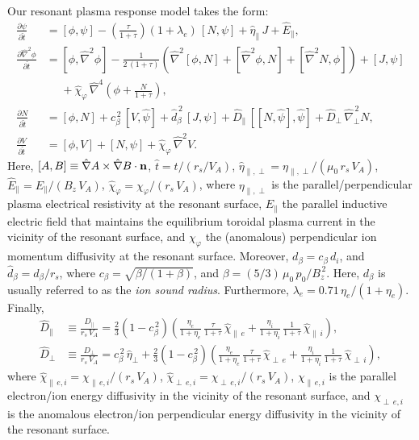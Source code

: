 \documentclass[12pt,prb,aps]{revtex4-1}
\begin{document}
Our resonant plasma response model takes the form:\,\cite{fw}
\begin{align}
\frac{\partial\psi}{\partial\hat{t}}&= [\phi,\psi] -\left(\frac{\tau}{1+\tau}\right)(1+\lambda_e)\,[N,\psi]
+\hat{\eta}_\parallel\,J + \hat{E}_\parallel,\\[0.5ex]
\frac{\partial \hat{\nabla}^2\phi}{\partial \hat{t}}&= [\phi,\hat{\nabla}^2\phi] - \frac{1}{2\,(1+\tau)}\left(\hat{\nabla}^2[\phi,N] + [\hat{\nabla}^2\phi,N] + [\hat{\nabla}^2 N,\phi]\right) + [J,\psi] \nonumber\\[0.5ex]&\phantom{=}+\hat{\chi}_\varphi  \,\hat{\nabla}^4\!\left(\phi + \frac{N}{1+\tau}\right), \\[0.5ex]
\frac{\partial N}{\partial \hat{t}}&= [\phi,N] +c_\beta^{\,2}\,[V,\hat{\psi}] +\hat{d}_\beta^{\,2}\,[J,\psi]
+ \hat{D}_\parallel \,[[N,\hat{\psi}],\hat{\psi}]+ \hat{D}_\perp\,\hat{\nabla}_\perp^{\,2}N,\\[0.5ex]
\frac{\partial V}{\partial\hat{t}}&= [\phi,V] +[N,\psi] + \hat{\chi}_\varphi\,\hat{\nabla}^2 V.\label{e21}
\end{align}
Here, $[A,B]\equiv \hat{\nabla} A\times \hat{\nabla} B\cdot {\bf n}$, $\hat{t} = t/(r_s/V_A)$, $\hat{\eta}_{\parallel,\perp} = \eta_{\parallel,\perp}/(\mu_0\,r_s\,V_A)$, $\hat{E}_\parallel = E_\parallel/(B_z\,V_A)$, 
$\hat{\chi}_\varphi= \chi_\varphi/(r_s\,V_A)$, where $\eta_{\parallel,\perp}$ is the parallel/perpendicular plasma electrical
resistivity at the resonant surface, $E_\parallel$ the parallel inductive electric field that maintains the equilibrium toroidal
plasma current in the vicinity of the resonant surface, and $\chi_\varphi$  the (anomalous) perpendicular ion momentum
diffusivity at the resonant surface. 
Moreover, $d_\beta=c_\beta\,d_i$, and $\hat{d}_\beta=d_\beta/r_s$, where $c_\beta = \sqrt{\beta/(1+\beta)}$, and
$\beta=(5/3)\,\mu_0\,p_0/B_z^{\,2}$. Here, $d_\beta$ is usually referred to as the {\em ion sound radius}. Furthermore,
$\lambda_e=0.71\,\eta_e/(1+\eta_e)$. Finally,\cite{fw}
\begin{align}
\hat{D}_\parallel&\equiv\frac{D_{\parallel}}{r_s\,V_A}= \frac{2}{3}\left(1-c_\beta^{\,2}\right)\!\left(\frac{\eta_e}{1+\eta_e}\,\frac{\tau}{1+\tau}\,\hat{\chi}_{\parallel\,e} + \frac{\eta_i}{1+\eta_i}\,\frac{1}{1+\tau}\,\hat{\chi}_{\parallel\,i}\right),\\[0.5ex]
\hat{D}_\perp& \equiv \frac{D_{\perp}}{r_s\,V_A}= c_\beta^{\,2}\,\hat{\eta}_\perp +  \frac{2}{3}\left(1-c_\beta^{\,2}\right)\!\left(\frac{\eta_e}{1+\eta_e}\,\frac{\tau}{1+\tau}\,\hat{\chi}_{\perp\,e} + \frac{\eta_i}{1+\eta_i}\,\frac{1}{1+\tau}\,\hat{\chi}_{\perp\,i}\right),
\end{align}
where $\hat{\chi}_{\parallel\,e,i}=\chi_{\parallel\,e,i}/(r_s\,V_A)$,  $\hat{\chi}_{\perp\,e,i}=\chi_{\perp\,e,i}/(r_s\,V_A)$, 
$\chi_{\parallel\,e,i}$ is the parallel electron/ion energy diffusivity in the vicinity of the resonant surface, and 
$\chi_{\perp\,e,i}$ is the anomalous
electron/ion perpendicular energy diffusivity in the vicinity of the resonant surface. 
\end{document}

